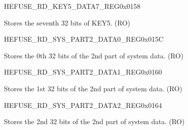 \begin{register}{H}{EFUSE\_RD\_KEY5\_DATA7\_REG}{0x0158}\label{regdesc:EFUSERDKEY5DATA7REG}
%
\regnewline%
\begin{regdesc}\begin{reglist}
\label{fielddesc:EFUSEKEY5DATA7}\item [EFUSE\_KEY5\_DATA7] Stores the seventh 32 bits of KEY5. (RO)
\end{reglist}\end{regdesc}
\end{register}


\begin{register}{H}{EFUSE\_RD\_SYS\_PART2\_DATA0\_REG}{0x015C}\label{regdesc:EFUSERDSYSPART2DATA0REG}
%
\regnewline%
\begin{regdesc}\begin{reglist}
\label{fielddesc:EFUSESYSDATAPART20}\item [EFUSE\_SYS\_DATA\_PART2\_0] Stores the 0th 32 bits of the 2nd part of system data. (RO)
\end{reglist}\end{regdesc}
\end{register}


\begin{register}{H}{EFUSE\_RD\_SYS\_PART2\_DATA1\_REG}{0x0160}\label{regdesc:EFUSERDSYSPART2DATA1REG}
%
\regnewline%
\begin{regdesc}\begin{reglist}
\label{fielddesc:EFUSESYSDATAPART21}\item [EFUSE\_SYS\_DATA\_PART2\_1] Stores the 1st 32 bits of the 2nd part of system data. (RO)
\end{reglist}\end{regdesc}
\end{register}


\begin{register}{H}{EFUSE\_RD\_SYS\_PART2\_DATA2\_REG}{0x0164}\label{regdesc:EFUSERDSYSPART2DATA2REG}
%
\regnewline%
\begin{regdesc}\begin{reglist}
\label{fielddesc:EFUSESYSDATAPART22}\item [EFUSE\_SYS\_DATA\_PART2\_2] Stores the 2nd 32 bits of the 2nd part of system data. (RO)
\end{reglist}\end{regdesc}
\end{register}


